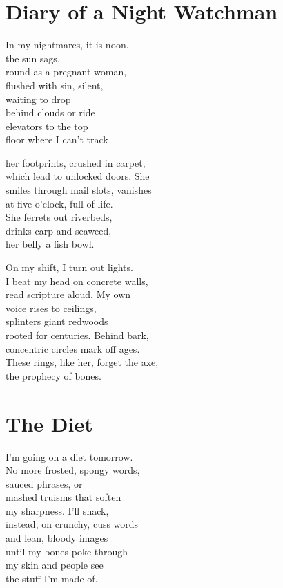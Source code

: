 \documentclass[twoside,10pt]{book}
\begin{document}
\clearpage
\section{Diary of a Night Watchman}

In my nightmares, it is noon.\\
the sun sags,\\
round as a pregnant woman,\\
flushed with sin, silent,\\
waiting to drop\\
behind clouds or ride\\
elevators to the top\\
floor where I can't track

her footprints, crushed in carpet,\\
which lead to unlocked doors. She\\
smiles through mail slots, vanishes\\
at five o'clock, full of life.\\
She ferrets out riverbeds,\\
drinks carp and seaweed,\\
her belly a fish bowl.

On my shift, I turn out lights.\\
I beat my head on concrete walls,\\
read scripture aloud. My own\\
voice rises to ceilings,\\
splinters giant redwoods\\
rooted for centuries. Behind bark,\\
concentric circles mark off ages.\\
These rings, like her, forget the axe,\\
the prophecy of bones.


\clearpage
\section{The Diet}

I'm going on a diet tomorrow.\\
No more frosted, spongy words,\\
sauced phrases, or\\
mashed truisms that soften\\
my sharpness. I'll snack,\\
instead, on crunchy, cuss words\\
and lean, bloody images\\
until my bones poke through\\
my skin and people see\\
the stuff I'm made of.
\end{document}

